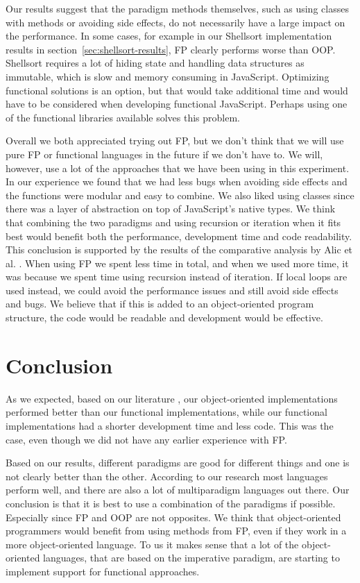 \documentclass {article}
\begin{document}
Our results suggest that the paradigm methods themselves, such as using classes with methods or avoiding side effects, do not necessarily have a large impact on the performance. In some cases, for example in our Shellsort implementation results in section~\ref{sec:shellsort-results}, FP clearly performs worse than OOP. Shellsort requires a lot of hiding state and handling data structures as immutable, which is slow and memory consuming in JavaScript. Optimizing functional solutions is an option, but that would take additional time and would have to be considered when developing functional JavaScript. Perhaps using one of the functional libraries available solves this problem.
 
Overall we both appreciated trying out FP, but we don't think that we will use pure FP or functional languages in the future if we don't have to. We will, however, use a lot of the approaches that we have been using in this experiment. In our experience we found that we had less bugs when avoiding side effects and the functions were modular and easy to combine. We also liked using classes since there was a layer of abstraction on top of JavaScript's native types. We think that combining the two paradigms and using recursion or iteration when it fits best would benefit both the performance, development time and code readability. This conclusion is supported by the results of the comparative analysis by Alic et al. \cite{alomgi}. When using FP we spent less time in total, and when we used more time, it was because we spent time using recursion instead of iteration. If local loops are used instead, we could avoid the performance issues and still avoid side effects and bugs. We believe that if this is added to an object-oriented program structure, the code would be readable and development would be effective.
\newpage
\section{Conclusion}
As we expected, based on our literature \cite{alomgi, saproamname}, our object-oriented implementations performed better than our functional implementations, while our functional implementations had a shorter development time and less code. This was the case, even though we did not have any earlier experience with FP.
 
Based on our results, different paradigms are good for different things and one is not clearly better than the other. According to our research most languages perform well, and there are also a lot of multiparadigm languages out there. Our conclusion is that it is best to use a combination of the paradigms if possible. Especially since FP and OOP are not opposites. We think that object-oriented programmers would benefit from using methods from FP, even if they work in a more object-oriented language. To us it makes sense that a lot of the object-oriented languages, that are based on the imperative paradigm, are starting to implement support for functional approaches.
\newpage
 
\end{document}
